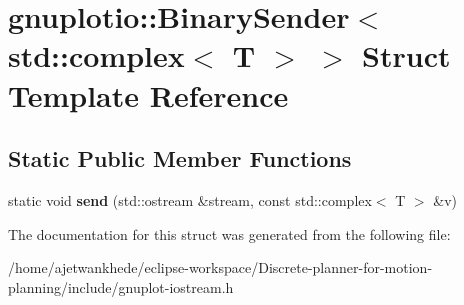 \hypertarget{structgnuplotio_1_1BinarySender_3_01std_1_1complex_3_01T_01_4_01_4}{}\section{gnuplotio\+:\+:Binary\+Sender$<$ std\+:\+:complex$<$ T $>$ $>$ Struct Template Reference}
\label{structgnuplotio_1_1BinarySender_3_01std_1_1complex_3_01T_01_4_01_4}
\subsection*{Static Public Member Functions}
\begin{DoxyCompactItemize}
\item 
\mbox{\label{structgnuplotio_1_1BinarySender_3_01std_1_1complex_3_01T_01_4_01_4_a759de700a1cd68000830a4b15a6fec49}} 
static void {\bfseries send} (std\+::ostream \&stream, const std\+::complex$<$ T $>$ \&v)
\end{DoxyCompactItemize}


The documentation for this struct was generated from the following file\+:\begin{DoxyCompactItemize}
\item 
/home/ajetwankhede/eclipse-\/workspace/\+Discrete-\/planner-\/for-\/motion-\/planning/include/gnuplot-\/iostream.\+h\end{DoxyCompactItemize}
